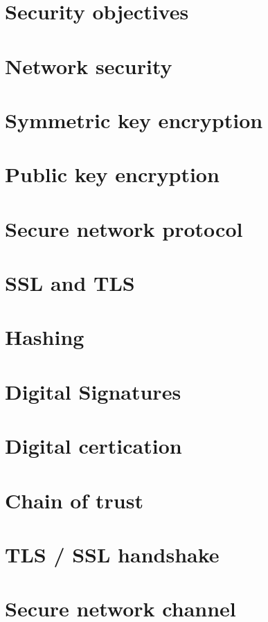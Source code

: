 \documentclass[11pt]{article}
\begin{document}
\section{Security objectives}

\section{Network security}

\section{Symmetric key encryption}

\section{Public key encryption}

\section{Secure network protocol}

\section{SSL and TLS}

\section{Hashing}

\section{Digital Signatures}

\section{Digital certication}

\section{Chain of trust}

\section{TLS / SSL handshake}

\section{Secure network channel}
\end{document}
